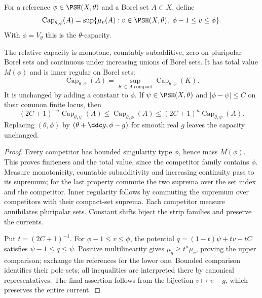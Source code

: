 \begin{definition}\label{def:relative-monge-ampere-capacity}
For a reference $\phi\in\PSH(X,\theta)$ and a Borel set $A\subset X$, define
\[
 \operatorname{Cap}_{\theta,\phi}(A)
       =\sup\{\mu_v(A):v\in\PSH(X,\theta),\ \phi-1\leq v\leq\phi\}.
\]
With $\phi=V_\theta$ this is the $\theta$-capacity.
\end{definition}

\begin{proposition}\label{prop:relative-capacity-basic}
The relative capacity is monotone, countably subadditive, zero on pluripolar Borel sets and continuous under increasing unions of Borel sets. It has total value $M(\phi)$ and is inner regular on Borel sets:
\[
 \operatorname{Cap}_{\theta,\phi}(A)
       =\sup_{K\subset A\text{ compact}}\operatorname{Cap}_{\theta,\phi}(K).
\]
It is unchanged by adding a constant to $\phi$. If $\psi\in\PSH(X,\theta)$ and $|\phi-\psi|\leq C$ on their common finite locus, then
\[
 (2C+1)^{-n}\operatorname{Cap}_{\theta,\psi}(A)
  \leq\operatorname{Cap}_{\theta,\phi}(A)
  \leq(2C+1)^n\operatorname{Cap}_{\theta,\psi}(A).
\]
Replacing $(\theta,\phi)$ by $(\theta+\ddc g,\phi-g)$ for smooth real $g$ leaves the capacity unchanged.
\end{proposition}
\begin{proof}
Every competitor has bounded singularity type $\phi$, hence mass $M(\phi)$. This proves finiteness and the total value, since the competitor family contains $\phi$. Measure monotonicity, countable subadditivity and increasing continuity pass to its supremum; for the last property commute the two suprema over the set index and the competitor. Inner regularity follows by commuting the supremum over competitors with their compact-set suprema. Each competitor measure annihilates pluripolar sets. Constant shifts biject the strip families and preserve the currents.

Put $t=(2C+1)^{-1}$. For $\phi-1\leq v\leq\phi$, the potential
$q=(1-t)\psi+tv-tC$ satisfies $\psi-1\leq q\leq\psi$. Positive multilinearity gives $\mu_q\geq t^n\mu_v$, proving the upper comparison; exchange the references for the lower one. Bounded comparison identifies their pole sets; all inequalities are interpreted there by canonical representatives. The final assertion follows from the bijection $v\mapsto v-g$, which preserves the entire current.
\end{proof}

